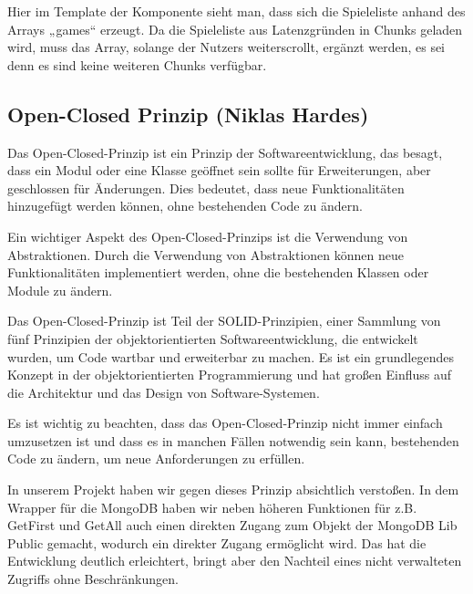 Hier im Template der Komponente sieht man, dass sich die Spieleliste anhand des Arrays „games“ erzeugt.
Da die Spieleliste aus Latenzgründen in Chunks geladen wird, muss das Array, solange der Nutzers weiterscrollt, ergänzt werden, es sei denn es sind keine weiteren Chunks verfügbar.

\subsection*{Open-Closed Prinzip (Niklas Hardes)}

Das Open-Closed-Prinzip ist ein Prinzip der Softwareentwicklung, das besagt, dass ein Modul oder eine Klasse geöffnet sein sollte für Erweiterungen, aber geschlossen für Änderungen. Dies bedeutet, dass neue Funktionalitäten hinzugefügt werden können, ohne bestehenden Code zu ändern.

Ein wichtiger Aspekt des Open-Closed-Prinzips ist die Verwendung von Abstraktionen. Durch die Verwendung von Abstraktionen können neue Funktionalitäten implementiert werden, ohne die bestehenden Klassen oder Module zu ändern.

Das Open-Closed-Prinzip ist Teil der SOLID-Prinzipien, einer Sammlung von fünf Prinzipien der objektorientierten Softwareentwicklung, die entwickelt wurden, um Code wartbar und erweiterbar zu machen. Es ist ein grundlegendes Konzept in der objektorientierten Programmierung und hat großen Einfluss auf die Architektur und das Design von Software-Systemen.

Es ist wichtig zu beachten, dass das Open-Closed-Prinzip nicht immer einfach umzusetzen ist und dass es in manchen Fällen notwendig sein kann, bestehenden Code zu ändern, um neue Anforderungen zu erfüllen.

In unserem Projekt haben wir gegen dieses Prinzip absichtlich verstoßen. In dem Wrapper für die MongoDB haben wir neben höheren Funktionen für z.B. GetFirst und GetAll auch einen direkten Zugang zum Objekt der MongoDB Lib Public gemacht, wodurch ein direkter Zugang ermöglicht wird. Das hat die Entwicklung deutlich erleichtert, bringt aber den Nachteil eines nicht verwalteten Zugriffs ohne Beschränkungen.